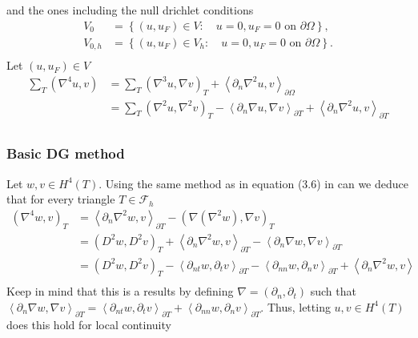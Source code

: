 and the ones including the null drichlet conditions \[
\begin{split}
    V_{0} &= \left\{ \left( u, u_{F} \right) \in  V : \quad u =0, u_{F} = 0 \text{ on } \partial \Omega   \right\}, \\
    V_{0,h} &= \left\{ \left( u, u_{F} \right) \in  V_{h} : \quad u =0, u_{F} = 0 \text{ on } \partial \Omega   \right\}
   . \\
\end{split}
\]
Let $\left( u, u_{F} \right) \in  V $\[
    \begin{split}
\sum_{T}^{} \left( \nabla ^{4} u,v \right) & = \sum_{T}^{} \left( \nabla ^{3} u, \nabla  v \right)_{T} + \left<\partial _{n}
\nabla ^2 u, v \right>_{\partial \Omega } \\
&= \sum_{T}^{} \left( \nabla ^2 u, \nabla ^2 v \right)_{T} - \left<\partial _{n} \nabla u, \nabla v \right>_{\partial T}
+ \left< \partial _{n} \nabla ^2 u, v \right> _{\partial T}\\
    \end{split}
\]


\subsubsection{Basic DG method}%
\label{ssub:basic_dg_method}
Let $w,v \in  H^{4} \left( T  \right) $. Using the same method as in equation (3.6) in  \cite{gu2012c0} can we
deduce that for every triangle $T \in  \mathcal{F}_{h} $ \[
    \begin{split}
        \left( \nabla ^{4} w, v \right) _{T} &= \left< \partial _{n} \nabla ^2 w, v \right>_{\partial T} - \left( \nabla \left( \nabla ^2 w
 \right), \nabla  v  \right)_{T}   \\
 &= \left( D^2w, D^2v \right)_{T} + \left< \partial _{n} \nabla ^2 w, v \right>_{\partial T}  - \left<\partial _{n}
 \nabla w, \nabla v \right>_{\partial T} \\
 &=  \left( D^2 w, D^2 v \right)_{T} - \left<\partial _{nt} w, \partial _{t} v \right>_{\partial T} - \left<\partial
 _{nn} w, \partial _{n} v \right> _{\partial T} +  \left<\partial _{n} \nabla ^2 w, v \right> \\
    \end{split}
\]
Keep in mind that this is a results by defining $\nabla  = \left( \partial _{n}, \partial _{t} \right) $ such that
$\left<\partial _{n} \nabla w, \nabla v \right>_{\partial T} = \left<\partial _{nt} w, \partial _{t} v\right> _{\partial
T} + \left< \partial _{nn} w, \partial _{n} v  \right> _{\partial T} $. Thus, letting $u,v \in
H^{4}\left( T  \right) $  does this hold for local continuity

